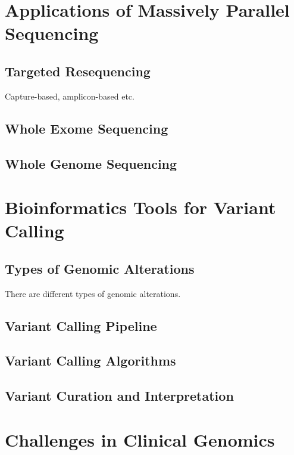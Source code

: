 \section{Applications of Massively Parallel Sequencing}
\label{sec:ApplicationsofMassivelyParallelSequencing}

\subsection{Targeted Resequencing}
Capture-based, amplicon-based etc.

\subsection{Whole Exome Sequencing}

\subsection{Whole Genome Sequencing}

\section{Bioinformatics Tools for Variant Calling}
\label{sec:BioinformaticsToolsforVariantCalling}

\subsection{Types of Genomic Alterations}
There are different types of genomic alterations.

\subsection{Variant Calling Pipeline}

\subsection{Variant Calling Algorithms}

\subsection{Variant Curation and Interpretation}

\section{Challenges in Clinical Genomics}
\label{sec:ChallengesinClinicalGenomics}

